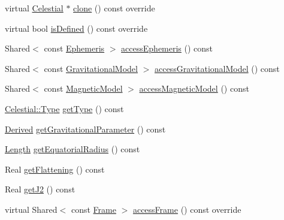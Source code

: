 \begin{DoxyCompactItemize}
\item 
virtual \hyperlink{classostk_1_1physics_1_1env_1_1obj_1_1_celestial}{Celestial} $\ast$ \hyperlink{classostk_1_1physics_1_1env_1_1obj_1_1_celestial_a87c6f3ec3c0ec9758ae52e3edc3fc5df}{clone} () const override
\item 
virtual bool \hyperlink{classostk_1_1physics_1_1env_1_1obj_1_1_celestial_a611b8fe6fcd3787bbf9981ad99dfe471}{is\+Defined} () const override
\item 
Shared$<$ const \hyperlink{classostk_1_1physics_1_1env_1_1_ephemeris}{Ephemeris} $>$ \hyperlink{classostk_1_1physics_1_1env_1_1obj_1_1_celestial_a381edd898ce5b55e533a250a8212cf1b}{access\+Ephemeris} () const
\item 
Shared$<$ const \hyperlink{namespaceostk_1_1physics_1_1env_1_1obj_a50c0bc72e8880f2fa2a910a81e050c97}{Gravitational\+Model} $>$ \hyperlink{classostk_1_1physics_1_1env_1_1obj_1_1_celestial_ad498343cdb085c4bb626442e69c583b0}{access\+Gravitational\+Model} () const
\item 
Shared$<$ const \hyperlink{namespaceostk_1_1physics_1_1env_1_1obj_a11552c1290e2f6b4693ea00c2df2c80d}{Magnetic\+Model} $>$ \hyperlink{classostk_1_1physics_1_1env_1_1obj_1_1_celestial_a3bf6a51759025bf14f1d766348548b22}{access\+Magnetic\+Model} () const
\item 
\hyperlink{classostk_1_1physics_1_1env_1_1obj_1_1_celestial_aa0711d887522b35b2b3630156d912779}{Celestial\+::\+Type} \hyperlink{classostk_1_1physics_1_1env_1_1obj_1_1_celestial_ad5b0fb87f14be14519ecddd37f134719}{get\+Type} () const
\item 
\hyperlink{classostk_1_1physics_1_1units_1_1_derived}{Derived} \hyperlink{classostk_1_1physics_1_1env_1_1obj_1_1_celestial_a433a6bf852e23db369fec77f02e90647}{get\+Gravitational\+Parameter} () const
\item 
\hyperlink{classostk_1_1physics_1_1units_1_1_length}{Length} \hyperlink{classostk_1_1physics_1_1env_1_1obj_1_1_celestial_ad0d484832d406c1e5b57cab731f839f3}{get\+Equatorial\+Radius} () const
\item 
Real \hyperlink{classostk_1_1physics_1_1env_1_1obj_1_1_celestial_ac57af98c82cfc344f24d1a91f45e99ff}{get\+Flattening} () const
\item 
Real \hyperlink{classostk_1_1physics_1_1env_1_1obj_1_1_celestial_ac7b892c6433c93f227d53f59285aac1d}{get\+J2} () const
\item 
virtual Shared$<$ const \hyperlink{classostk_1_1physics_1_1coord_1_1_frame}{Frame} $>$ \hyperlink{classostk_1_1physics_1_1env_1_1obj_1_1_celestial_a0140fc682a707ec2dc715828e532db79}{access\+Frame} () const override

\end{DoxyCompactItemize}

